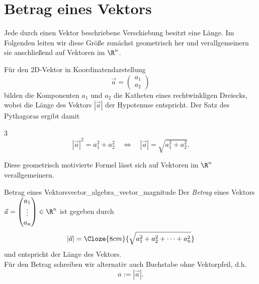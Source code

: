 \section{Betrag eines Vektors}
\label{sec:vector_algebra_magnitude}

Jede durch einen Vektor beschriebene Verschiebung besitzt eine Länge. Im
Folgenden leiten wir diese Größe zunächst geometrisch her und verallgemeinern
sie anschließend auf Vektoren im $\R^n$.

\vspace{\baselineskip}
\noindent
\begin{minipage}[c]{0.56\linewidth}
  Für den 2D-Vektor in Koordinatendarstellung
  \[
    \vec a=\begin{pmatrix}a_1\\a_2\end{pmatrix}
  \]
  bilden die Komponenten $a_1$ und $a_2$ die Katheten eines rechtwinkligen
  Dreiecks, wobei die Länge des Vektors $|\vec a|$ der Hypotenuse entspricht.
  Der Satz des Pythagoras ergibt damit 
  \begin{ClozeArea}[16]{3}
    \[
      |\vec a|^2=a_1^2+a_2^2
      \quad\Longleftrightarrow\quad
      |\vec a|=\sqrt{a_1^2+a_2^2}.
    \]
  \end{ClozeArea}
\end{minipage}\hfill
\begin{minipage}[c]{0.38\linewidth}
  \centering
\end{minipage}\par
\vspace{0.6em}
\noindent
Diese geometrisch motivierte Formel lässt sich auf Vektoren im $\R^n$
verallgemeinern.

\begin{DefinitionBox}{Betrag eines Vektors}{vector_algebra_vector_magnitude}
  Der \emph{Betrag}  eines Vektors
  $\vec a=\begin{pmatrix}a_1\\\vdots\\a_n\end{pmatrix}\in\R^n$ ist gegeben durch
  \[
    |\vec a| = \Cloze{8cm}{\sqrt{a_1^2+a_2^2+\dots+a_n^2}}
  \]
  und entspricht der Länge des Vektors. \\
  Für den Betrag schreiben wir alternativ auch Buchstabe ohne Vektorpfeil, d.h. $$a:=|\vec a|.$$
\end{DefinitionBox}

